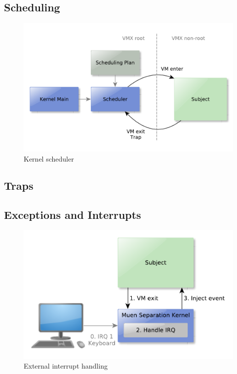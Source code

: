 \subsection{Scheduling}
\begin{figure}[h]
	\centering
	\includegraphics[scale=0.6]{images/scheduler-overview}
	\caption{Kernel scheduler}
	\label{fig:scheduler-overview}
\end{figure}

\subsection{Traps}
\subsection{Exceptions and Interrupts}
\begin{figure}[h]
	\centering
	\includegraphics[scale=0.6]{images/external-interrupt}
	\caption{External interrupt handling}
	\label{fig:external-interrupt}
\end{figure}

